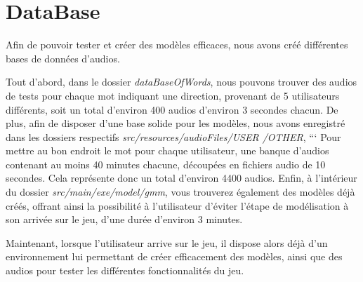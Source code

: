 \section{DataBase}
\label{sec:data_base}

Afin de pouvoir tester et créer des modèles efficaces,
nous avons créé différentes bases de données d'audios.

Tout d'abord, dans le dossier \textit{dataBaseOfWords},
nous pouvons trouver des audios de tests pour chaque mot indiquant une direction,
provenant de 5 utilisateurs différents,
soit un total d'environ 400 audios d'environ 3 secondes chacun.
De plus, afin de disposer d'une base solide pour les modèles,
nous avons enregistré dans les dossiers respectifs \textit{src/resources/audioFiles/USER /OTHER},
``` Pour mettre au bon endroit le mot
pour chaque utilisateur, une banque d'audios contenant au moins 40 minutes chacune,
découpées en fichiers audio de 10 secondes.
Cela représente donc un total d'environ 4400 audios.
Enfin, à l'intérieur du dossier \textit{src/main/exe/model/gmm},
vous trouverez également des modèles déjà créés,
offrant ainsi la possibilité à l'utilisateur d'éviter l'étape de modélisation à son arrivée sur le jeu,
d'une durée d'environ 3 minutes.

Maintenant, lorsque l'utilisateur arrive sur le jeu,
il dispose alors déjà d'un environnement lui permettant de créer efficacement des modèles,
ainsi que des audios pour tester les différentes fonctionnalités du jeu.
